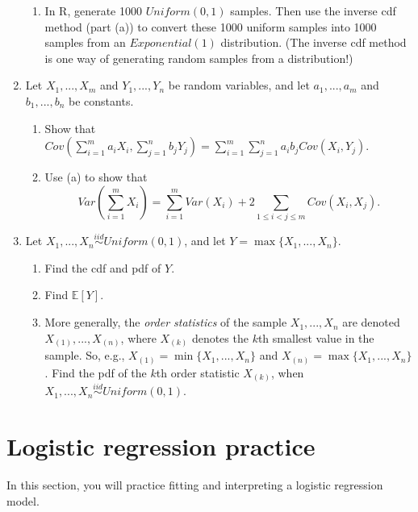 \documentclass[11pt]{article}
\begin{document}
\begin{enumerate}
\begin{enumerate}
\item In R, generate 1000 $Uniform(0, 1)$ samples. Then use the inverse cdf method (part (a)) to convert these 1000 uniform samples into 1000 samples from an $Exponential(1)$ distribution. (The inverse cdf method is one way of generating random samples from a distribution!)
\end{enumerate}

\item Let $X_1,...,X_m$ and $Y_1,...,Y_n$ be random variables, and let $a_1,...,a_m$ and $b_1,...,b_n$ be constants.

\begin{enumerate}
\item Show that $Cov\left( \sum \limits_{i=1}^m a_i X_i, \sum \limits_{j=1}^n b_j Y_j \right) = \sum \limits_{i=1}^m \sum \limits_{j=1}^n a_i b_j Cov(X_i, Y_j)$.

\item Use (a) to show that
$$Var\left(\sum \limits_{i=1}^m X_i\right) = \sum \limits_{i=1}^m Var(X_i) + 2 \sum \limits_{1 \leq i < j \leq m} Cov(X_i, X_j).$$
\end{enumerate}

\item Let $X_1,...,X_n \overset{iid}{\sim} Uniform(0, 1)$, and let $Y = \max \{X_1,...,X_n\}$. 

\begin{enumerate}
\item Find the cdf and pdf of $Y$.

\item Find $\mathbb{E}[Y]$.

\item More generally, the \textit{order statistics} of the sample $X_1,...,X_n$ are denoted $X_{(1)},...,X_{(n)}$, where $X_{(k)}$ denotes the $k$th smallest value in the sample. So, e.g., $X_{(1)} = \min \{X_1,...,X_n\}$ and $X_{(n)} = \max\{X_1,...,X_n\}$. Find the pdf of the $k$th order statistic $X_{(k)}$, when $X_1,...,X_n \overset{iid}{\sim} Uniform(0, 1)$.
\end{enumerate}

\end{enumerate}

\section{Logistic regression practice}

In this section, you will practice fitting and interpreting a logistic regression model.
\end{document}
